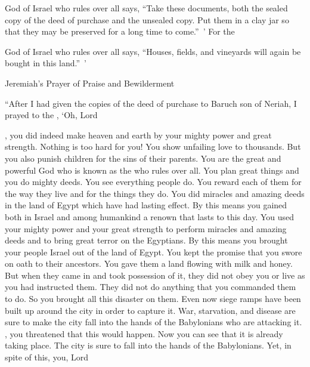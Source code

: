 {{}
God
of Israel
who rules over all
says, “Take
these
documents,
both the
sealed
copy of the deed of purchase
and the unsealed
copy. Put
them in a clay jar
so that they may
be preserved
for a long
time to come.” ’
For
the

{}
God
of Israel
who rules over all
says, “Houses,
fields,
and vineyards
will again
be bought
in this
land.” ’
\par }{\SH Jeremiah’s Prayer of Praise and Bewilderment
\par }{\PP {}“After
I
had given
the copies
of the deed
of purchase
to
Baruch
son
of Neriah,
I prayed
to
the {},
‘Oh,
Lord

{}, you
did indeed
make
heaven
and earth
by your mighty power
and great
strength.
Nothing
is too hard for you!
You show
unfailing love
to thousands.
But you also punish children
for the sins
of their parents.
You are the great
and powerful
God
who is known
as the
{}
who rules over all.
You plan
great
things and you do mighty
deeds.
You see
everything
people
do.
You
reward
each
of them
for the way
they live
and for the things they do.
You
did miracles
and amazing
deeds in the land
of Egypt
which have had
lasting
effect.
By
this
means you gained both in Israel
and among humankind
a renown
that lasts to this
day.
You used your mighty power
and your great
strength
to perform miracles
and amazing deeds
and to bring
great
terror
on the Egyptians. By this means you brought
your people
Israel
out
of the land
of Egypt.
You kept
the promise
that you swore on oath
to their ancestors.
You gave
them a land
flowing
with milk
and honey.
But when they came
in and took possession
of it, they did not
obey
you or
live
as
you had
instructed
them. They did
not
do
anything
that
you commanded them
to do. So
you brought all
this
disaster on them.
Even now
siege ramps
have been built up
around the city
in order to capture
it. War,
starvation,
and disease
are sure to make
the city
fall into
the hands
of the Babylonians
who are attacking
it.
{}, you threatened
that
this would happen.
Now
you can see that it is already taking place.
The city
is sure to fall into the hands
of the Babylonians.
Yet, in spite of this, you,
Lord

}
